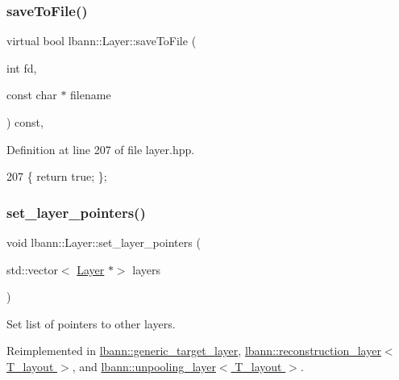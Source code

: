 \subsubsection{\texorpdfstring{save\+To\+File()}{saveToFile()}}
{\footnotesize\ttfamily virtual bool lbann\+::\+Layer\+::save\+To\+File (\begin{DoxyParamCaption}\item[{int}]{fd,  }\item[{const char $\ast$}]{filename }\end{DoxyParamCaption}) const\hspace{0.3cm}{\ttfamily [inline]}, {\ttfamily [virtual]}}



Definition at line 207 of file layer.\+hpp.


\begin{DoxyCode}
207 \{ \textcolor{keywordflow}{return} \textcolor{keyword}{true}; \};
\end{DoxyCode}
\mbox{\label{classlbann_1_1Layer_a001ea76cdd05e2d0d475f408f24702ee}} 
\subsubsection{\texorpdfstring{set\+\_\+layer\+\_\+pointers()}{set\_layer\_pointers()}}
{\footnotesize\ttfamily void lbann\+::\+Layer\+::set\+\_\+layer\+\_\+pointers (\begin{DoxyParamCaption}\item[{std\+::vector$<$ \hyperlink{classlbann_1_1Layer}{Layer} $\ast$$>$}]{layers }\end{DoxyParamCaption})\hspace{0.3cm}{\ttfamily [virtual]}}

Set list of pointers to other layers. 

Reimplemented in \hyperlink{classlbann_1_1generic__target__layer_a1f8f722fadb1223b063c0917afd83b66}{lbann\+::generic\+\_\+target\+\_\+layer}, \hyperlink{classlbann_1_1reconstruction__layer_a663b2810780ee2b0817f611a00b0b07f}{lbann\+::reconstruction\+\_\+layer$<$ T\+\_\+layout $>$}, and \hyperlink{classlbann_1_1unpooling__layer_aacc3a2fdd75ecee8614a00a85697a763}{lbann\+::unpooling\+\_\+layer$<$ T\+\_\+layout $>$}.



